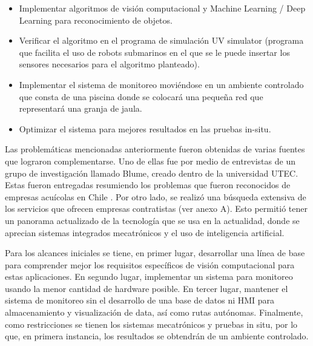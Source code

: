 \begin{itemize}
    \item Implementar algoritmos de visión computacional y Machine Learning / Deep Learning para reconocimiento de objetos. 
    \item Verificar el algoritmo en el programa de simulación UV simulator (programa que facilita el uso de robots submarinos en el que se le puede insertar los sensores necesarios para el algoritmo planteado).
    \item Implementar el sistema de monitoreo moviéndose en un ambiente controlado que consta de una piscina donde se colocará una pequeña red que representará una granja de jaula.
    \item Optimizar el sistema para mejores resultados en las pruebas in-situ.
\end{itemize}


Las problemáticas mencionadas anteriormente fueron obtenidas de varias fuentes que lograron complementarse. Uno de ellas fue por medio de entrevistas de un grupo de investigación llamado Blume, creado dentro de la universidad UTEC. Estas fueron entregadas resumiendo los problemas que fueron reconocidos de empresas acuícolas en Chile \cite{Entrevistas_Blume}. Por otro lado, se realizó una búsqueda extensiva de los servicios que ofrecen empresas contratistas (ver anexo A). Esto permitió tener un panorama actualizado de la tecnología que se usa en la actualidad, donde se aprecian sistemas integrados mecatrónicos y el uso de inteligencia artificial.


Para los alcances iniciales se tiene, en primer lugar, desarrollar una línea de base para comprender mejor los requisitos específicos de visión computacional para estas aplicaciones. En segundo lugar, implementar un sistema para monitoreo usando la menor cantidad de hardware posible. En tercer lugar, mantener el sistema de monitoreo sin el desarrollo de una base de datos ni HMI para almacenamiento y visualización de data, así como rutas autónomas. Finalmente, como restricciones se tienen los sistemas mecatrónicos y pruebas in situ, por lo que, en primera instancia, los resultados se obtendrán de un ambiente controlado. 